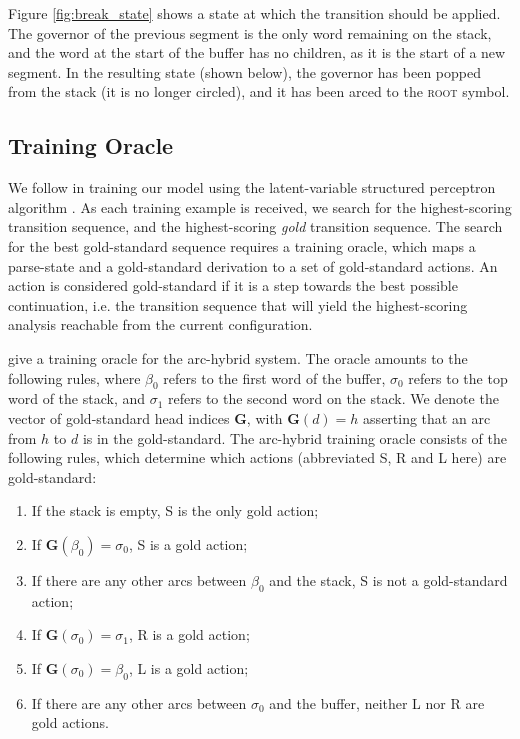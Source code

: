 \documentclass[11pt,letterpaper]{article}
\begin{document}
Figure \ref{fig:break_state} shows a state at which the transition should
be applied.  The governor of the previous segment is the only word remaining
on the stack, and the word at the start of the buffer has no children, as it
is the start of a new segment.  In the resulting state (shown below), the governor
has been popped from the stack (it is no longer circled), and it has been arced
to the \textsc{root} symbol.

\subsection{Training Oracle}

We follow \citet{honnibal:14} in training our model using the latent-variable
structured perceptron algorithm \citep{sun:09}.  As each training example is
received, we search for the highest-scoring transition sequence, and the highest-scoring
\emph{gold} transition sequence.  The search for the best gold-standard sequence
requires a training oracle, which maps a parse-state and a gold-standard derivation
to a set of gold-standard actions.  An action is considered gold-standard if
it is a step towards the best possible continuation, i.e. the
transition sequence that will yield the highest-scoring analysis reachable from
the current configuration.

\citet{goldberg:13} give a training oracle for the arc-hybrid system.  The oracle
amounts to the following rules, where $\beta_0$ refers to the first word of the
buffer, $\sigma_0$ refers to the top word of the stack, and $\sigma_1$ refers
to the second word on the stack.  We denote the vector of gold-standard
head indices $\mathbf{G}$, with
$\mathbf{G}(d)=h$ asserting that an arc from $h$
to $d$ is in the gold-standard.  The arc-hybrid training oracle consists of
the following rules, which determine which actions (abbreviated S, R and L here)
are gold-standard:

\begin{enumerate}
    \item If the stack is empty, S is the only gold action;
    \item If $\mathbf{G}(\beta_0)=\sigma_0$, S is a gold action; 
    \item If there are any other arcs between $\beta_0$ and the stack, S is 
          not a gold-standard action;
      \item If $\mathbf{G}(\sigma_0)=\sigma_1$, R is a gold action;
      \item If $\mathbf{G}(\sigma_0)=\beta_0$, L is a gold action;
    \item If there are any other arcs between $\sigma_0$ and the buffer, neither
          L nor R are gold actions.
\end{enumerate}
\end{document}

